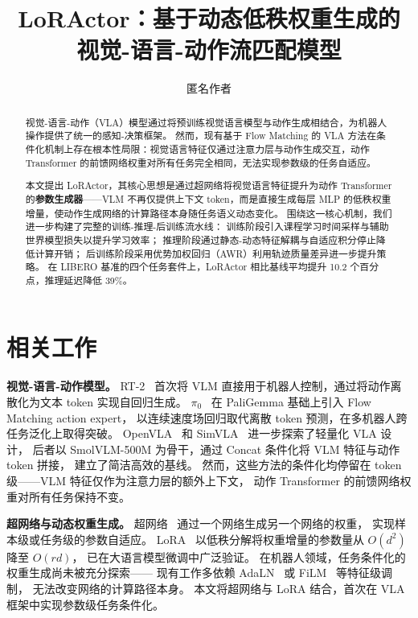 \documentclass[10pt,twocolumn]{ctexart}
\title{\textbf{LoRActor：基于动态低秩权重生成的\\视觉-语言-动作流匹配模型}}
\author{匿名作者}
\date{}
\begin{document}
\maketitle

\begin{abstract}
视觉-语言-动作（VLA）模型通过将预训练视觉语言模型与动作生成相结合，为机器人操作提供了统一的感知-决策框架。
然而，现有基于 Flow Matching 的 VLA 方法在条件化机制上存在根本性局限：视觉语言特征仅通过注意力层与动作生成交互，动作 Transformer 的前馈网络权重对所有任务完全相同，无法实现参数级的任务自适应。

本文提出 LoRActor，其核心思想是通过超网络将视觉语言特征提升为动作 Transformer 的\textbf{参数生成器}——VLM 不再仅提供上下文 token，而是直接生成每层 MLP 的低秩权重增量，使动作生成网络的计算路径本身随任务语义动态变化。
围绕这一核心机制，我们进一步构建了完整的训练-推理-后训练流水线：
训练阶段引入课程学习时间采样与辅助世界模型损失以提升学习效率；
推理阶段通过静态-动态特征解耦与自适应积分停止降低计算开销；
后训练阶段采用优势加权回归（AWR）利用轨迹质量差异进一步提升策略。
在 LIBERO 基准的四个任务套件上，LoRActor 相比基线平均提升 10.2 个百分点，推理延迟降低 39\%。
\end{abstract}

\section{相关工作}

\textbf{视觉-语言-动作模型。}
RT-2~\cite{brohan2023rt2} 首次将 VLM 直接用于机器人控制，通过将动作离散化为文本 token 实现自回归生成。
$\pi_0$~\cite{black2024pi0} 在 PaliGemma 基础上引入 Flow Matching action expert，
以连续速度场回归取代离散 token 预测，在多机器人跨任务泛化上取得突破。
OpenVLA~\cite{kim2024openvla} 和 SimVLA~\cite{simvla2024} 进一步探索了轻量化 VLA 设计，
后者以 SmolVLM-500M 为骨干，通过 Concat 条件化将 VLM 特征与动作 token 拼接，
建立了简洁高效的基线。
然而，这些方法的条件化均停留在 token 级——VLM 特征仅作为注意力层的额外上下文，
动作 Transformer 的前馈网络权重对所有任务保持不变。

\textbf{超网络与动态权重生成。}
超网络~\cite{ha2017hypernetworks} 通过一个网络生成另一个网络的权重，
实现样本级或任务级的参数自适应。
LoRA~\cite{hu2022lora} 以低秩分解将权重增量的参数量从 $O(d^2)$ 降至 $O(rd)$，
已在大语言模型微调中广泛验证。
在机器人领域，任务条件化的权重生成尚未被充分探索——
现有工作多依赖 AdaLN~\cite{peebles2023dit} 或 FiLM~\cite{perez2018film} 等特征级调制，
无法改变网络的计算路径本身。
本文将超网络与 LoRA 结合，首次在 VLA 框架中实现参数级任务条件化。
\end{document}
